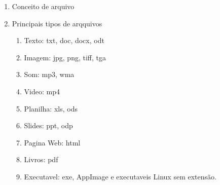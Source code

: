 \begin{enumerate}
	\item Conceito de arquivo
	\item Principais tipos de arqquivos
	\begin{enumerate}
		\item Texto: txt, doc, docx, odt
		\item Imagem: jpg, png, tiff, tga
		\item Som: mp3, wma
		\item Video: mp4
		\item Planilha: xls, ods
		\item Slides: ppt, odp
		\item Pagina Web: html
		\item Livros: pdf
		\item Executavel: exe, AppImage e executaveis Linux sem extensão.
	\end{enumerate}
\end{enumerate}